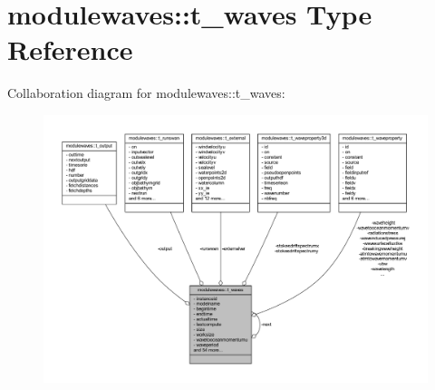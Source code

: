 \hypertarget{structmodulewaves_1_1t__waves}{}\section{modulewaves\+:\+:t\+\_\+waves Type Reference}
\label{structmodulewaves_1_1t__waves}


Collaboration diagram for modulewaves\+:\+:t\+\_\+waves\+:\nopagebreak
\begin{figure}[H]
\begin{center}
\leavevmode
\includegraphics[width=350pt]{structmodulewaves_1_1t__waves__coll__graph}
\end{center}
\end{figure}
